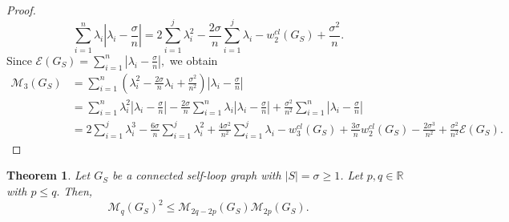 \documentclass[12pt,a4paper,reqno]{amsart}
\numberwithin{equation}{section}
\theoremstyle{plain}
\newtheorem{theorem}{Theorem}[section]
\theoremstyle{definition}
\newcommand{\<}{\langle}
\renewcommand{\>}{\rangle}
\newcommand{\cE}{{\mathcal E}}
\newcommand{\cM}{{\mathcal M}}
\newcommand{\R}{{\mathbb R}}
\begin{document}
\begin{proof}
\[\sum^n_{i=1}\lambda_i\left| \lambda_i - \frac{\sigma}{n}\right|
= 2\sum^j_{i=1} \lambda_i^2 - \frac{2\sigma}{n} \sum^j_{i=1} \lambda_i  - w_2^{cl}(G_S) + \frac{\sigma^2}{n}.
\]
Since $\cE(G_S)= \sum^n_{i=1}|\lambda_i - \frac{\sigma}{n}|,$ we obtain
\begin{align*}
\cM_3(G_S)
&= \sum^n_{i=1}\left(\lambda^2_i -\frac{2\sigma}{n} \lambda_i +\frac{\sigma^2}{n^2}\right) \left| \lambda_i - \frac{\sigma}{n}\right| \\
&=\sum^n_{i=1}\lambda^2_i\left| \lambda_i - \frac{\sigma}{n}\right| -\frac{2\sigma}{n} \sum^n_{i=1}\lambda_i\left| \lambda_i - \frac{\sigma}{n}\right|  + \frac{\sigma^2}{n^2} \sum^n_{i=1}\left| \lambda_i - \frac{\sigma}{n}\right| \\
&= 2\sum^j_{i=1} \lambda_i^3 - \frac{6\sigma}{n} \sum^j_{i=1} \lambda_i^2 + \frac{4\sigma^2}{n^2} \sum^j_{i=1} \lambda_i  - w_3^{cl}(G_S) + \frac{3\sigma}{n} w_2^{cl}(G_S)  - \frac{2\sigma^3}{n^2} + \frac{\sigma^2}{n^2} \cE(G_S) .
\end{align*}
\end{proof}


\vspace{-0.2em}
\begin{theorem}
\label{mainInq}
Let $G_S$ be a connected self-loop graph with $|S|=\sigma \geq 1$.  Let $p, q \in \R$ with $p \leq q.$ Then, 
\begin{equation}
\cM_q(G_S)^2 \leq \cM_{2q -2p}(G_S) \cM_{2p}(G_S).
\end{equation}
\end{theorem}
\end{document}
